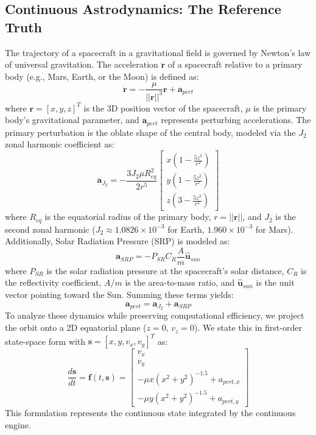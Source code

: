 \documentclass[a4paper,fleqn]{cas-sc}
\begin{document}
\subsection{Continuous Astrodynamics: The Reference Truth}
The trajectory of a spacecraft in a gravitational field is governed by Newton's law of universal gravitation. The acceleration $\ddot{\mathbf{r}}$ of a spacecraft relative to a primary body (e.g., Mars, Earth, or the Moon) is defined as:
\begin{equation}
    \ddot{\mathbf{r}} = -\frac{\mu}{||\mathbf{r}||^3}\mathbf{r} + \mathbf{a}_{pert}
    \label{eq:two_body}
\end{equation}
where $\mathbf{r} = [x, y, z]^T$ is the 3D position vector of the spacecraft, $\mu$ is the primary body's gravitational parameter, and $\mathbf{a}_{pert}$ represents perturbing accelerations. The primary perturbation is the oblate shape of the central body, modeled via the $J_2$ zonal harmonic coefficient as:
\begin{equation}
    \mathbf{a}_{J_2} = -\frac{3 J_2 \mu R_{eq}^2}{2 r^5} \begin{bmatrix}
        x \left(1 - \frac{5z^2}{r^2}\right) \\
        y \left(1 - \frac{5z^2}{r^2}\right) \\
        z \left(3 - \frac{5z^2}{r^2}\right)
    \end{bmatrix}
    \label{eq:j2}
\end{equation}
where $R_{eq}$ is the equatorial radius of the primary body, $r = ||\mathbf{r}||$, and $J_2$ is the second zonal harmonic ($J_2 \approx 1.0826 \times 10^{-3}$ for Earth, $1.960 \times 10^{-3}$ for Mars). Additionally, Solar Radiation Pressure (SRP) is modeled as:
\begin{equation}
    \mathbf{a}_{SRP} = -P_{SR} C_R \frac{A}{m} \hat{\mathbf{u}}_{sun}
    \label{eq:srp}
\end{equation}
where $P_{SR}$ is the solar radiation pressure at the spacecraft's solar distance, $C_R$ is the reflectivity coefficient, $A/m$ is the area-to-mass ratio, and $\hat{\mathbf{u}}_{sun}$ is the unit vector pointing toward the Sun. Summing these terms yields:
\begin{equation}
    \mathbf{a}_{pert} = \mathbf{a}_{J_2} + \mathbf{a}_{SRP}
\end{equation}
To analyze these dynamics while preserving computational efficiency, we project the orbit onto a 2D equatorial plane ($z = 0$, $v_z = 0$). We state this in first-order state-space form with $\mathbf{s} = [x, y, v_x, v_y]^T$ as:
\begin{equation}
    \frac{d\mathbf{s}}{dt} = \mathbf{f}(t, \mathbf{s}) = \begin{bmatrix} v_x \\ v_y \\ -\mu x (x^2 + y^2)^{-1.5} + a_{pert, x} \\ -\mu y (x^2 + y^2)^{-1.5} + a_{pert, y} \end{bmatrix}
    \label{eq:state_space}
\end{equation}
This formulation represents the continuous state integrated by the continuous engine.
\end{document}

